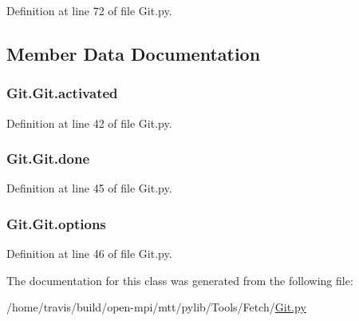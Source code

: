 Definition at line 72 of file Git.\-py.



\subsection{Member Data Documentation}
\hypertarget{class_git_1_1_git_a22d3012cb93bad0a9122dd84afdfeee9}{
\subsubsection[{activated}]{\setlength{\rightskip}{0pt plus 5cm}Git.\-Git.\-activated}}\label{class_git_1_1_git_a22d3012cb93bad0a9122dd84afdfeee9}


Definition at line 42 of file Git.\-py.

\hypertarget{class_git_1_1_git_adb8991008d4bb4568fa9c2f991711cda}{
\subsubsection[{done}]{\setlength{\rightskip}{0pt plus 5cm}Git.\-Git.\-done}}\label{class_git_1_1_git_adb8991008d4bb4568fa9c2f991711cda}


Definition at line 45 of file Git.\-py.

\hypertarget{class_git_1_1_git_a7560b88b014c5da8785739c7bb6283ed}{
\subsubsection[{options}]{\setlength{\rightskip}{0pt plus 5cm}Git.\-Git.\-options}}\label{class_git_1_1_git_a7560b88b014c5da8785739c7bb6283ed}


Definition at line 46 of file Git.\-py.



The documentation for this class was generated from the following file\-:\begin{DoxyCompactItemize}
\item 
/home/travis/build/open-\/mpi/mtt/pylib/\-Tools/\-Fetch/\hyperlink{_git_8py}{Git.\-py}\end{DoxyCompactItemize}
